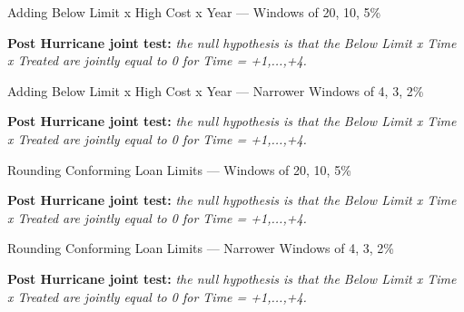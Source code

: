 \documentclass{article}
\begin{document}
\begin{sidewaystable}
                    
    \caption{Adding Below Limit x High Cost x Year --- Windows of 20, 10, 5\%}
                    
    \begin{center}
    
    \end{center}
                 
    \textbf{Post Hurricane joint test:} \emph{the null hypothesis is that the Below Limit x Time x Treated are jointly equal to 0 for Time = +1,...,+4.}
   
\end{sidewaystable}

\begin{sidewaystable}
                    
    \caption{Adding Below Limit x High Cost x Year --- Narrower Windows of 4, 3, 2\%}

    \begin{center}
    
    \end{center}
                 
    \textbf{Post Hurricane joint test:} \emph{the null hypothesis is that the Below Limit x Time x Treated are jointly equal to 0 for Time = +1,...,+4.}
   
\end{sidewaystable}

\begin{sidewaystable}
                    
    \caption{Rounding Conforming Loan Limits --- Windows of 20, 10, 5\%}

    \begin{center}
    
    \end{center}
                 
    \textbf{Post Hurricane joint test:} \emph{the null hypothesis is that the Below Limit x Time x Treated are jointly equal to 0 for Time = +1,...,+4.}
   
\end{sidewaystable}

\begin{sidewaystable}
                    
    \caption{Rounding Conforming Loan Limits --- Narrower Windows of 4, 3, 2\%}
                    
    \begin{center}
    
    \end{center}
                
    \textbf{Post Hurricane joint test:} \emph{the null hypothesis is that the Below Limit x Time x Treated are jointly equal to 0 for Time = +1,...,+4.}
    
\end{sidewaystable}
\end{document}
